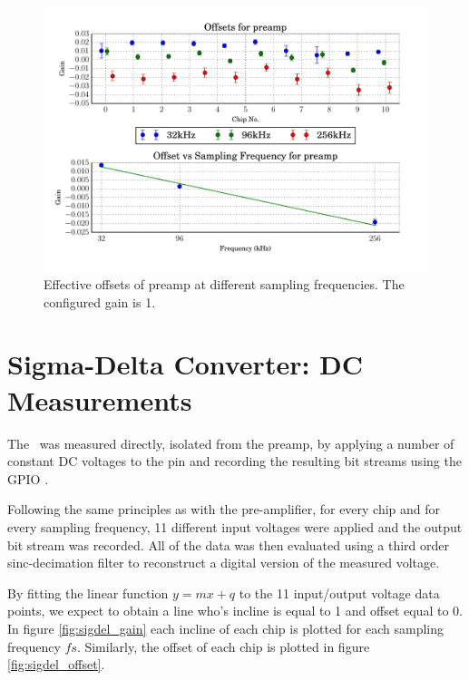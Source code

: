 \begin{figure}
    \centering
    \includegraphics[width=.85\linewidth]{images/plots/dc_offsets_preamp.pdf}
    \caption{Effective offsets of preamp at different sampling frequencies. The configured gain is 1.}
    \label{fig:preamp_offsets}
\end{figure}

\section{Sigma-Delta Converter: DC Measurements}
\label{sec:sigdelDC}

The \sdm~was measured directly, isolated from the preamp, by applying a number
of  constant  DC  voltages  to  the  pin  and  recording  the
resulting bit streams using the GPIO \raspi.

Following  the  same  principles as with the pre-amplifier, for every chip and
for every sampling frequency, 11 different input voltages were applied and the
output bit  stream  was  recorded.  All of the data was then evaluated using a
third order sinc-decimation filter to reconstruct a  digital  version  of  the
measured voltage.

By fitting the linear function $y=mx+q$ to  the  11  input/output voltage data
points, we expect to obtain a  line  who's  incline  is  equal to 1 and offset
equal to 0. In figure \ref{fig:sigdel_gain}  each  incline  of  each  chip  is
plotted for  each  sampling frequency $fs$. Similarly, the offset of each chip
is plotted in figure \ref{fig:sigdel_offset}.

